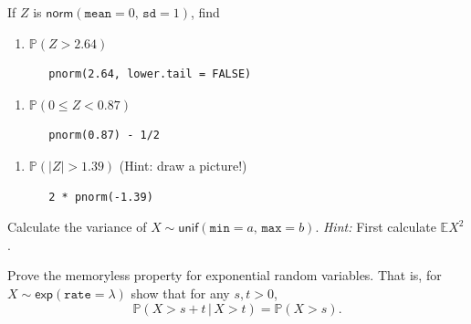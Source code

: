 \documentclass[captions=tableheading]{scrbook}
\begin{document}
\begin{xca}
If \(Z\) is \(\mathsf{norm}(\mathtt{mean}=0,\,\mathtt{sd}=1)\), find 
\begin{enumerate}
\item \(\mathbb{P}(Z>2.64)\)

\lstset{language=R}
\begin{lstlisting}
   pnorm(2.64, lower.tail = FALSE)
\end{lstlisting}
\end{enumerate}

\begin{enumerate}
\item \(\mathbb{P}(0\leq Z<0.87)\)

\lstset{language=R}
\begin{lstlisting}
   pnorm(0.87) - 1/2
\end{lstlisting}
\end{enumerate}

\begin{enumerate}
\item \(\mathbb{P}(|Z|>1.39)\) (Hint: draw a picture!)

\lstset{language=R}
\begin{lstlisting}
   2 * pnorm(-1.39)
\end{lstlisting}
\end{enumerate}

\end{xca}

\begin{xca}
Calculate the variance of \(X\sim\mathsf{unif}(\mathtt{min}=a,\,\mathtt{max}=b)\). \emph{Hint:} First calculate \(\mathbb{E} X^{2}\).
\end{xca}

\begin{xca}
Prove the memoryless property for exponential random variables. That is, for \(X\sim\mathsf{exp}(\mathtt{rate}=\lambda)\) show that for any \(s,t>0\),
\[
\mathbb{P}(X>s+t\,|\, X>t)=\mathbb{P}(X>s).
\]
\end{xca}
\end{document}
